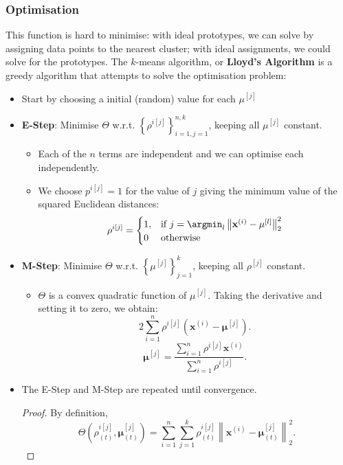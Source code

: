 \subsubsection{Optimisation}
This function is hard to minimise: with ideal prototypes, we can solve by
assigning data points to the nearest cluster; with ideal assignments, we could
solve for the prototypes.
The $k$-means algorithm, or \textbf{Lloyd's Algorithm} is a greedy algorithm
that attempts to solve the optimisation problem:
\begin{itemize}
  \item Start by choosing a initial (random) value for each $\mu^{[j]}$
  \item \textbf{E-Step}: Minimise $\Theta$ w.r.t. ${\left\{ \rho^{i[j]}
    \right\}}^{n,k}_{i=1,j=1}$, keeping all $\mu^{[j]}$ constant.
    \begin{itemize}
      \item Each of the $n$ terms are independent and we can optimise each
        independently.
      \item We choose $p^{i[j]}=1$ for the value of $j$ giving the minimum
        value of the squared Euclidean distances:
        \[\rho^{i[j]}=\begin{cases} 1,&\text{if }j=\argmin_l\left\lVert
        \mathbf{x}^{(i)}-\mathbf{\mu}^{[l]} \right\rVert_2^2\\
      0&\text{otherwise}\end{cases}\]
    \end{itemize}
  \item \textbf{M-Step}: Minimise $\Theta$ w.r.t. ${\left\{ \mu^{[j]}
    \right\}}^{k}_{j=1}$, keeping all $\rho^{[j]}$ constant.
    \begin{itemize}
      \item $\Theta$ is a convex quadratic function of $\mu^{[j]}$. Taking the
        derivative and setting it to zero, we obtain:
        \[2 \sum_{i=1}^{n} \rho^{i[j]}\left( \mathbf{x}^{(i)}-\mathbf{\mu}^{[j]} \right).\] 
        \[\mathbf{\mu}^{[j]}=\frac{\sum_{i=1}^{n} \rho^{i[j]}\mathbf{x}^{(i)}}{\sum_{i=1}^{n} \rho^{i[j]}}.\] 
    \end{itemize}
  \item The E-Step and M-Step are repeated until convergence.\\
    \begin{proof}
      By definition,
      \[\Theta\left( \rho^{i[j]}_{(t)},\mathbf{\mu}^{[j]}_{(t)} \right)=
      \sum_{i=1}^{n} \sum_{j=1}^{k} \rho^{i[j]}_{(t)}\left\lVert \mathbf{x}^{(i)}-\mathbf{\mu}_{(t)}^{[j]} \right\rVert_2^2.\] 

\end{proof}
\end{itemize}
